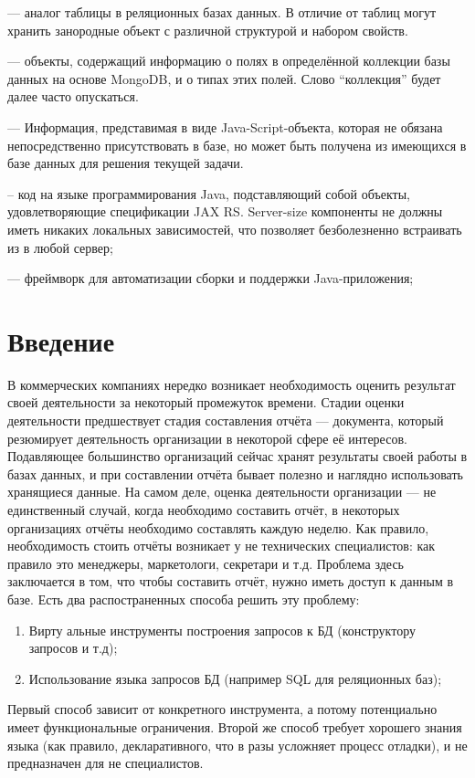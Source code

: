 \documentclass[12pt]{article}
\begin{document}
     --- аналог таблицы в реляционных базах данных. В отличие от таблиц могут хранить занородные объект с различной структурой
    и набором свойств\cite{MDBIntro}.

     --- объекты, содержащий информацию о полях в определённой коллекции базы данных на основе MongoDB, и о типах
    этих полей. Слово ``коллекция'' будет далее часто опускаться.

     --- Информация, представимая в виде Java-Script-объекта, которая не обязана
    непосредственно присутствовать в базе, но может быть получена из имеющихся в базе
    данных для решения текущей задачи.

     -- код на языке программирования Java, подставляющий собой объекты, удовлетворяющие спецификации
    JAX RS. Server-size компоненты не должны иметь никаких локальных зависимостей, что позволяет безболезненно встраивать из
    в любой сервер;

     --- фреймворк для автоматизации сборки и поддержки Java-приложения\cite{maven};
    \newpage


    \section{Введение}
    В коммерческих компаниях нередко возникает необходимость оценить результат своей деятельности за некоторый промежуток
    времени. Стадии оценки деятельности предшествует стадия составления отчёта --- документа, который резюмирует деятельность
    организации в некоторой сфере её интересов. Подавляющее большинство организаций сейчас хранят результаты своей работы
    в базах данных, и при составлении отчёта бывает полезно и наглядно использовать хранящиеся данные. На самом деле,
    оценка деятельности организации --- не единственный случай, когда необходимо составить отчёт, в некоторых
    организациях отчёты необходимо составлять каждую неделю. Как правило, необходимость стоить отчёты возникает у не технических специалистов:
    как правило это менеджеры, маркетологи, секретари и т.д. Проблема здесь заключается в том, что чтобы составить отчёт, нужно иметь доступ к данным
    в базе. Есть два распостраненных способа решить эту проблему:
    \begin{enumerate}
        \item Вирту альные инструменты построения запросов к БД (конструктору запросов и т.д);
        \item Использование языка запросов БД (например SQL для реляционных баз);
    \end{enumerate}
    Первый способ зависит от конкретного инструмента, а потому потенциально имеет функциональные ограничения. Второй же способ требует хорошего
    знания языка (как правило, декларативного, что в разы усложняет процесс отладки), и не предназначен для не специалистов.
\end{document}
